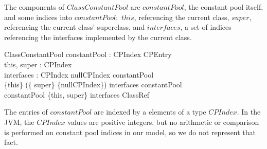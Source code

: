 The components of $ClassConstantPool$ are $constantPool$, the constant
pool itself, and some indices into $constantPool$:~$this$, referencing
the current class, $super$, referencing the current class' superclass,
and $interfaces$, a set of indices referencing the interfaces
implemented by the current class.
\begin{schema}{ClassConstantPool}
  constantPool : CPIndex \pfun CPEntry \\
  this, super : CPIndex \\
  interfaces : \finset CPIndex
\where
  nullCPIndex \notin \dom constantPool \\
  \{this\} \cup (\{ super\} \setminus \{nullCPIndex\}) \cup interfaces \subseteq \dom constantPool \\
  constantPool \limg \{this, super\} \cup interfaces \rimg \subseteq \ran ClassRef
\end{schema}
The entries of $constantPool$ are indexed by a elements of a type
$CPIndex$.
In the JVM, the $CPIndex$ values are positive integers, but no
arithmetic or comparison is performed on constant pool indices in our
model, so we do not represent that fact.

